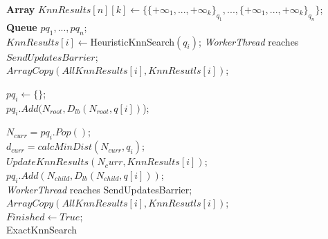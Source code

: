 \small
\begin{algorithm}
	\DontPrintSemicolon
	\vspace{.2cm}
	\textbf{Array} $KnnResults[n][k] \gets \{\{+\infty_{1}, ..., +\infty_{k}\}_{q_{1}}, ..., \{+\infty_{1}, ..., +\infty_{k}\}_{q_{n}}\}$;\\
	\textbf{Queue} $pq_{1}, ..., pq_{n}$;\\
	\vspace{.2cm}
	{%
		$KnnResults[i] \gets  ${\sc HeuristicKnnSearch}$(q_{i})$;
	}
 	{\it WorkerThread} reaches $SendUpdatesBarrier$; \\
 	{
 		$ArrayCopy(AllKnnResults[i], KnnResutls[i])$;
 	}
 	
 	{
 		$pq_i \gets \{\}$;\\
 		$pq_i.Add(N_{root},D_{lb}(N_{root}, q[i])$);\\
 	}
 
 	{
 		{
 			$N_{curr} = pq_{i}.Pop()$;\\
 			{
 				$d_{curr} = calcMinDist(N_{curr}, q_{i})$;\\
 				{
 					$UpdateKnnResults(N_curr, KnnResults[i])$;\\
 				}
 			}
 			\Else
 			{
 				{
 					{
 						$pq_i.Add(N_{child},D_{lb}(N_{child}, q[i]))$;\\	
 					}	
 				}
 			}
 		}
 		{\it WorkerThread} reaches SendUpdatesBarrier; \\
 		{
 			$ArrayCopy(AllKnnResults[i], KnnResutls[i])$;\\	
 		}
 	}
 	$Finished \gets True$;\\
	\caption{{\sc ExactKnnSearch}}
	\label{algo:exact_knn_search}
\end{algorithm}

